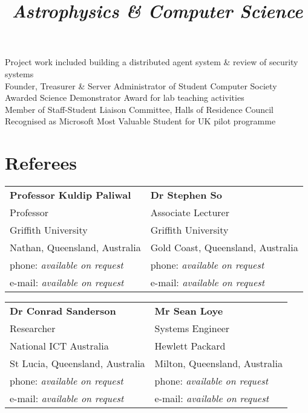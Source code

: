 \documentclass{resume}
\begin{document}
\begin{resume}
\title{\textsl{Astrophysics \& Computer Science}}
\begin{position}
Project work included building a distributed agent system \& review of security systems  \vspace{1mm}\\
Founder, Treasurer \& Server Administrator of Student Computer Society  \vspace{1mm}\\
Awarded Science Demonstrator Award for lab teaching activities  \vspace{1mm}\\
Member of Staff-Student Liaison Committee, Halls of Residence Council  \vspace{1mm}\\
Recognised as Microsoft Most Valuable Student for UK pilot programme
\end{position}
\section{Referees} 

\begin{tabular}{@{}p{6cm}p{6cm}}
\textbf{Professor Kuldip Paliwal}       &  \textbf{Dr Stephen So}                   \\
Professor                               &  Associate Lecturer                       \\
Griffith University                     &  Griffith University                      \\
Nathan, Queensland, Australia           &  Gold Coast, Queensland, Australia        \\
phone: \textsl{available on request}    &  phone: \textsl{available on request}     \\
e-mail: \textsl{available on request}   &  e-mail: \textsl{available on request}    \\
\end{tabular}

\begin{tabular}{@{}p{6cm}p{6cm}}
\textbf{Dr Conrad Sanderson}            &  \textbf{Mr Sean Loye}                    \\
Researcher                              &  Systems Engineer                         \\
National ICT Australia                  &  Hewlett Packard                          \\
St Lucia, Queensland, Australia         &  Milton, Queensland, Australia            \\
phone: \textsl{available on request}    &  phone: \textsl{available on request}     \\
e-mail: \textsl{available on request}   &  e-mail: \textsl{available on request}    \\
\end{tabular}



\end{resume}
\end{document}

